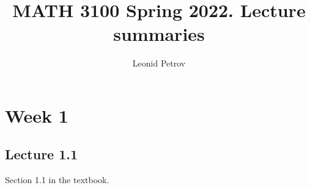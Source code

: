 \documentclass[letterpaper,11pt,oneside,reqno]{amsart}
\numberwithin{equation}{section}
\theoremstyle{definition}
\begin{document}
\title{MATH 3100 Spring 2022. Lecture summaries}


\author{Leonid Petrov}

\date{}

\maketitle

\section{Week 1}

\subsection{Lecture 1.1}


Section 1.1 in the textbook.
\end{document}
